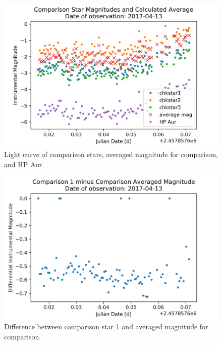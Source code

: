 \begin{figure}[h]
    \centering
    \includegraphics{figures/hpaur170413COM.png}
    \caption{Light curve of comparison stars, averaged magnitude for comparison, and HP Aur.}
\label{fig:hpCOM}
\end{figure}

\begin{figure}[h]
    \centering
    \includegraphics{figures/hpaur170413CHK.png}
    \caption{Difference between comparison star 1 and averaged magnitude for comparison.}
\label{fig:hpCHK}
\end{figure}

